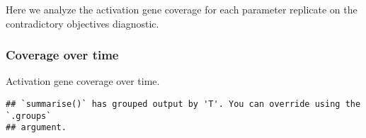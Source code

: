\documentclass[]{book}
\newenvironment{Shaded}{\begin{snugshade}}{\end{snugshade}}
\newcommand{\DataTypeTok}[1]{\textcolor[rgb]{0.13,0.29,0.53}{#1}}
\newcommand{\KeywordTok}[1]{\textcolor[rgb]{0.13,0.29,0.53}{\textbf{#1}}}
\newcommand{\NormalTok}[1]{#1}
\newcommand{\OperatorTok}[1]{\textcolor[rgb]{0.81,0.36,0.00}{\textbf{#1}}}
\newcommand{\StringTok}[1]{\textcolor[rgb]{0.31,0.60,0.02}{#1}}
\begin{document}
Here we analyze the activation gene coverage for each parameter replicate on the contradictory objectives diagnostic.

\hypertarget{coverage-over-time-3}{%
\subsubsection{Coverage over time}\label{coverage-over-time-3}}

Activation gene coverage over time.

\begin{Shaded}
\end{Shaded}

\begin{verbatim}
## `summarise()` has grouped output by 'T'. You can override using the `.groups`
## argument.
\end{verbatim}
\end{document}
